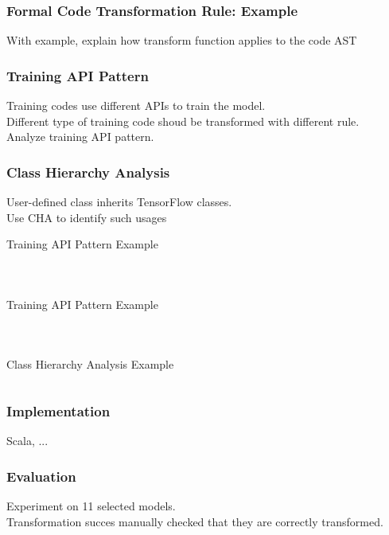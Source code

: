 \documentclass{beamer}
\begin{document}
\begin{frame}
  \frametitle{Formal Code Transformation Rule: Example}
  With example, explain how transform function applies to the code AST
\end{frame}


\begin{frame}
  \frametitle{Training API Pattern}
  Training codes use different APIs to train the model.\\
  Different type of training code shoud be transformed with different rule.\\
  Analyze training API pattern.
\end{frame}


\begin{frame}
  \frametitle{Class Hierarchy Analysis}
  User-defined class inherits TensorFlow classes.\\
  Use CHA to identify such usages
\end{frame}

\begin{frame}{Training API Pattern Example}
  \begin{columns}[t]
    \begin{column}{0.5\textwidth}
      {\tiny
      \inputminted{Python}{tensorflow_tape_ex.py}
      }
    \end{column}

    \begin{column}{0.5\textwidth}
      {\tiny
      \inputminted{Python}{horovod_tape_ex.py}
      }
    \end{column}
  \end{columns}
\end{frame}

\begin{frame}{Training API Pattern Example}
  \begin{columns}[t]
    \begin{column}{0.5\textwidth}
      {\tiny
      \inputminted{Python}{tensorflow_keras_ex.py}
      }
    \end{column}

    \begin{column}{0.5\textwidth}
      {\tiny
      \inputminted{Python}{horovod_keras_ex.py}
      }
    \end{column}
  \end{columns}
\end{frame}


\begin{frame}{Class Hierarchy Analysis Example}
  {\tiny
  \inputminted{Python}{cha_ex.py}
  }
\end{frame}

\begin{frame}
  \frametitle{Implementation}
  Scala, ...
\end{frame}


\begin{frame}
  \frametitle{Evaluation}
  Experiment on 11 selected models.\\
  Transformation succes
  manually checked that they are correctly transformed.\\
\end{frame}
\end{document}
